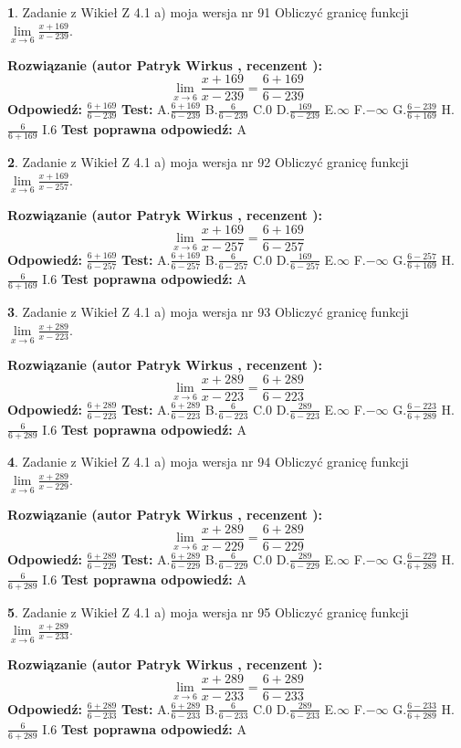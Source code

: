 \documentclass[12pt, a4paper]{article}
\theoremstyle{definition} %
\newtheorem{zad}{}
\newcommand{\zadStart}[1]{\begin{zad}#1\newline}
\newcommand{\zadStop}{\end{zad}}
\newcommand{\rozwStart}[2]{\noindent \textbf{Rozwiązanie (autor #1 , recenzent #2): }\newline}
\newcommand{\rozwStop}{\newline}
\newcommand{\odpStart}{\noindent \textbf{Odpowiedź:}\newline}
\newcommand{\odpStop}{\newline}
\newcommand{\testStart}{\noindent \textbf{Test:}\newline}
\newcommand{\testStop}{\newline}
\newcommand{\kluczStart}{\noindent \textbf{Test poprawna odpowiedź:}\newline}
\newcommand{\kluczStop}{\newline}
\begin{document}
\zadStart{Zadanie z Wikieł Z 4.1 a) moja wersja nr 91}
Obliczyć granicę funkcji $\lim\limits_{x\to6}\frac{x+169}{x-239}$.
\zadStop
\rozwStart{Patryk Wirkus}{}
$$\lim\limits_{x\to6}\frac{x+169}{x-239} = \frac{6+169}{6-239}$$
\rozwStop
\odpStart
$\frac{6+169}{6-239}$
\odpStop
\testStart
A.$\frac{6+169}{6-239}$
B.$\frac{6}{6-239}$
C.$0$
D.$\frac{169}{6-239}$
E.$\infty$
F.$-\infty$
G.$\frac{6-239}{6+169}$
H.$\frac{6}{6+169}$
I.$6$
\testStop
\kluczStart
A
\kluczStop



\zadStart{Zadanie z Wikieł Z 4.1 a) moja wersja nr 92}
Obliczyć granicę funkcji $\lim\limits_{x\to6}\frac{x+169}{x-257}$.
\zadStop
\rozwStart{Patryk Wirkus}{}
$$\lim\limits_{x\to6}\frac{x+169}{x-257} = \frac{6+169}{6-257}$$
\rozwStop
\odpStart
$\frac{6+169}{6-257}$
\odpStop
\testStart
A.$\frac{6+169}{6-257}$
B.$\frac{6}{6-257}$
C.$0$
D.$\frac{169}{6-257}$
E.$\infty$
F.$-\infty$
G.$\frac{6-257}{6+169}$
H.$\frac{6}{6+169}$
I.$6$
\testStop
\kluczStart
A
\kluczStop



\zadStart{Zadanie z Wikieł Z 4.1 a) moja wersja nr 93}
Obliczyć granicę funkcji $\lim\limits_{x\to6}\frac{x+289}{x-223}$.
\zadStop
\rozwStart{Patryk Wirkus}{}
$$\lim\limits_{x\to6}\frac{x+289}{x-223} = \frac{6+289}{6-223}$$
\rozwStop
\odpStart
$\frac{6+289}{6-223}$
\odpStop
\testStart
A.$\frac{6+289}{6-223}$
B.$\frac{6}{6-223}$
C.$0$
D.$\frac{289}{6-223}$
E.$\infty$
F.$-\infty$
G.$\frac{6-223}{6+289}$
H.$\frac{6}{6+289}$
I.$6$
\testStop
\kluczStart
A
\kluczStop



\zadStart{Zadanie z Wikieł Z 4.1 a) moja wersja nr 94}
Obliczyć granicę funkcji $\lim\limits_{x\to6}\frac{x+289}{x-229}$.
\zadStop
\rozwStart{Patryk Wirkus}{}
$$\lim\limits_{x\to6}\frac{x+289}{x-229} = \frac{6+289}{6-229}$$
\rozwStop
\odpStart
$\frac{6+289}{6-229}$
\odpStop
\testStart
A.$\frac{6+289}{6-229}$
B.$\frac{6}{6-229}$
C.$0$
D.$\frac{289}{6-229}$
E.$\infty$
F.$-\infty$
G.$\frac{6-229}{6+289}$
H.$\frac{6}{6+289}$
I.$6$
\testStop
\kluczStart
A
\kluczStop



\zadStart{Zadanie z Wikieł Z 4.1 a) moja wersja nr 95}
Obliczyć granicę funkcji $\lim\limits_{x\to6}\frac{x+289}{x-233}$.
\zadStop
\rozwStart{Patryk Wirkus}{}
$$\lim\limits_{x\to6}\frac{x+289}{x-233} = \frac{6+289}{6-233}$$
\rozwStop
\odpStart
$\frac{6+289}{6-233}$
\odpStop
\testStart
A.$\frac{6+289}{6-233}$
B.$\frac{6}{6-233}$
C.$0$
D.$\frac{289}{6-233}$
E.$\infty$
F.$-\infty$
G.$\frac{6-233}{6+289}$
H.$\frac{6}{6+289}$
I.$6$
\testStop
\kluczStart
A
\kluczStop
\end{document}
